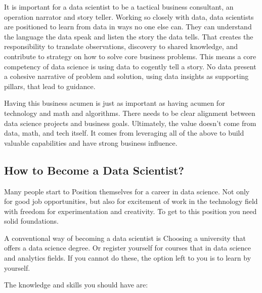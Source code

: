 \documentclass[
]{book}
\begin{document}
It is important for a data scientist to be a tactical business consultant, an operation narrator and story teller. Working so closely with data, data scientists are positioned to learn from data in ways no one else can. They can understand the language the data speak and listen the story the data tells. That creates the responsibility to translate observations, discovery to shared knowledge, and contribute to strategy on how to solve core business problems. This means a core competency of data science is using data to cogently tell a story. No data present a cohesive narrative of problem and solution, using data insights as supporting pillars, that lead to guidance.

Having this business acumen is just as important as having acumen for technology and math and algorithms. There needs to be clear alignment between data science projects and business goals. Ultimately, the value doesn't come from data, math, and tech itself. It comes from leveraging all of the above to build valuable capabilities and have strong business influence.

\hypertarget{how-to-become-a-data-scientist}{%
\subsection{How to Become a Data Scientist?}\label{how-to-become-a-data-scientist}}

Many people start to Position themselves for a career in data science. Not only for good job opportunities, but also for excitement of work in the technology field with freedom for experimentation and creativity. To get to this position you need solid foundations.

A conventional way of becoming a data scientist is Choosing a university that offers a data science degree. Or register yourself for courses that in data science and analytics fields. If you cannot do these, the option left to you is to learn by yourself.

The knowledge and skills you should have are:
\end{document}
